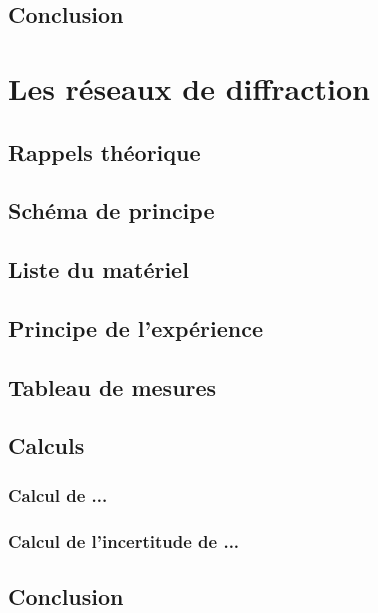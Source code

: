 \documentclass[11pt,a4paper]{report}
\begin{document}
	\section{Conclusion}
\chapter{Les réseaux de diffraction}
	\section{Rappels théorique}
	\section{Schéma de principe}
	\section{Liste du matériel}
	\section{Principe de l'expérience}
	\section{Tableau de mesures}
	\section{Calculs}
		\subsection{Calcul de ...}
		\subsection{Calcul de l'incertitude de ...}
	\section{Conclusion}
\end{document}
